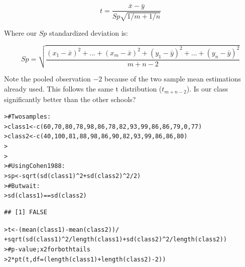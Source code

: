 \documentclass[12pt]{article}\usepackage[]{graphicx}\usepackage[]{color}
\makeatletter
\newcommand{\hlnum}[1]{\textcolor[rgb]{0.82,0.78,0.62}{#1}}%
\newcommand{\hlcom}[1]{\textcolor[rgb]{0.404,0.408,0.42}{#1}}%
\newcommand{\hlopt}[1]{\textcolor[rgb]{0.882,0.878,0.898}{#1}}%
\newcommand{\hlstd}[1]{\textcolor[rgb]{0.882,0.878,0.898}{#1}}%
\newcommand{\hlkwb}[1]{\textcolor[rgb]{0.902,0.675,0.196}{#1}}%
\newcommand{\hlkwc}[1]{\textcolor[rgb]{0.812,0.522,0.388}{#1}}%
\newcommand{\hlkwd}[1]{\textcolor[rgb]{0.733,0.388,0.812}{#1}}%
\newenvironment{kframe}{%
 \def\at@end@of@kframe{}%
 \ifinner\ifhmode%
  \def\at@end@of@kframe{\end{minipage}}%
  \begin{minipage}{\columnwidth}%
 \fi\fi%
 \def\FrameCommand##1{\hskip\@totalleftmargin \hskip-\fboxsep
 \colorbox{shadecolor}{##1}\hskip-\fboxsep
     \hskip-\linewidth \hskip-\@totalleftmargin \hskip\columnwidth}%
 \MakeFramed {\advance\hsize-\width
   \@totalleftmargin\z@ \linewidth\hsize
   \@setminipage}}%
 {\par\unskip\endMakeFramed%
 \at@end@of@kframe}
\newenvironment{knitrout}{}{} %
\makeatother
\begin{document}
\begin{flushleft}
$$ t = \frac{\bar{x}-\bar{y}}{Sp \sqrt{1/m + 1/n}} $$

Where our $Sp$ standardized deviation is:

$$ Sp = \sqrt{ \frac{ (x_1 - \bar{x})^2 + \text{...} + (x_m - \bar{x})^2 + (y_1 - \bar{y})^2 + \text{...} + (y_n - \bar{y})^2  }{m+n -2}} $$

Note the pooled observation $-2$ because of the two sample mean estimations already used. This follows the same t distribution ($t_{m+n-2}$). Is our class significantly better than the other schools?

\begin{knitrout}
\color{fgcolor}\begin{kframe}
\begin{alltt}
\hlstd{> }\hlcom{# Two samples:}
\hlstd{> }\hlstd{class1} \hlkwb{<-} \hlkwd{c}\hlstd{(}\hlnum{60}\hlstd{,}\hlnum{70}\hlstd{,}\hlnum{80}\hlstd{,}\hlnum{78}\hlstd{,}\hlnum{98}\hlstd{,}\hlnum{86}\hlstd{,}\hlnum{78}\hlstd{,}\hlnum{82}\hlstd{,}\hlnum{93}\hlstd{,}\hlnum{99}\hlstd{,}\hlnum{86}\hlstd{,}\hlnum{86}\hlstd{,}\hlnum{79}\hlstd{,}\hlnum{0}\hlstd{,}\hlnum{77}\hlstd{)}
\hlstd{> }\hlstd{class2} \hlkwb{<-} \hlkwd{c}\hlstd{(}\hlnum{40}\hlstd{,}\hlnum{100}\hlstd{,}\hlnum{81}\hlstd{,}\hlnum{88}\hlstd{,}\hlnum{98}\hlstd{,}\hlnum{86}\hlstd{,}\hlnum{90}\hlstd{,}\hlnum{82}\hlstd{,}\hlnum{93}\hlstd{,}\hlnum{99}\hlstd{,}\hlnum{86}\hlstd{,}\hlnum{86}\hlstd{,}\hlnum{80}\hlstd{)}
\hlstd{> }
\hlstd{> }
\hlstd{> }\hlcom{# Using Cohen 1988:}
\hlstd{> }\hlstd{sp} \hlkwb{<-} \hlkwd{sqrt}\hlstd{(} \hlkwd{sd}\hlstd{(class1)}\hlopt{^}\hlnum{2} \hlopt{+} \hlkwd{sd}\hlstd{(class2)}\hlopt{^}\hlnum{2} \hlopt{/} \hlnum{2}\hlstd{)}
\hlstd{> }\hlcom{# But wait:}
\hlstd{> }\hlkwd{sd}\hlstd{(class1)} \hlopt{==} \hlkwd{sd}\hlstd{(class2)}
\end{alltt}
\begin{verbatim}
## [1] FALSE
\end{verbatim}
\begin{alltt}
\hlstd{> }\hlstd{t} \hlkwb{<-} \hlstd{(}\hlkwd{mean}\hlstd{(class1)} \hlopt{-} \hlkwd{mean}\hlstd{(class2))} \hlopt{/}
\hlstd{+ }     \hlkwd{sqrt}\hlstd{(} \hlkwd{sd}\hlstd{(class1)}\hlopt{^}\hlnum{2}\hlopt{/}\hlkwd{length}\hlstd{(class1)} \hlopt{+} \hlkwd{sd}\hlstd{(class2)}\hlopt{^}\hlnum{2}\hlopt{/}\hlkwd{length}\hlstd{(class2))}
\hlstd{> }\hlcom{# p-value; x2 for both tails}
\hlstd{> }\hlnum{2}\hlopt{*}\hlkwd{pt}\hlstd{(t,} \hlkwc{df} \hlstd{= (}\hlkwd{length}\hlstd{(class1)} \hlopt{+} \hlkwd{length}\hlstd{(class2)} \hlopt{-} \hlnum{2}\hlstd{) )}

\end{alltt}
\end{kframe}
\end{knitrout}
\end{flushleft}
\end{document}
